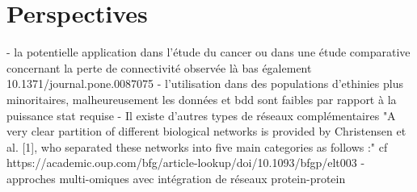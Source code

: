 \section{Perspectives}

- la potentielle application dans l'étude du cancer ou dans une étude comparative concernant la perte de connectivité observée là bas également 10.1371/journal.pone.0087075
- l'utilisation dans des populations d'ethinies plus minoritaires, malheureusement les données et bdd sont faibles par rapport à la puissance stat requise
- Il existe d'autres types de réseaux complémentaires "A very clear partition of different biological networks is provided by Christensen et al. [1], who separated these networks into five main categories as follows :" cf https://academic.oup.com/bfg/article-lookup/doi/10.1093/bfgp/elt003
- approches multi-omiques avec intégration de réseaux protein-protein %